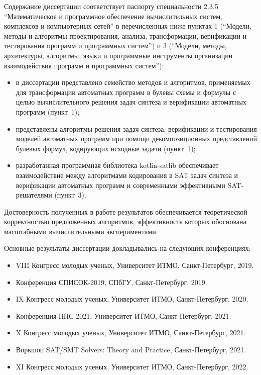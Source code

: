 \relevance
%
Содержание диссертации соответствует паспорту специальности 2.3.5 \enquote{Математическое и программное обеспечение вычислительных систем, комплексов и компьютерных сетей} в перечисленных ниже пунктах 1 (\enquote{Модели, методы и алгоритмы проектирования, анализа, трансформации, верификации и тестирования программ и программных систем}) и 3 (\enquote{Модели, методы, архитектуры, алгоритмы, языки и программные инструменты организации взаимодействия программ и программных систем}):
\begin{itemize}[beginpenalty=10000]
    \item в диссертации представлено семейство методов и алгоритмов, применяемых для трансформации автоматных программ в булевы схемы и формулы с целью вычислительного решения задач синтеза и верификации автоматных программ (пункт~1);
    \item представлены алгоритмы решения задач синтеза, верификации и тестирования моделей автоматных программ при помощи декомпозиционных представлений булевых формул, кодирующих исходные задачи (пункт~1);
    \item разработанная программная библиотека kotlin-satlib обеспечивает взаимодействие между алгоритмами кодирования в SAT задач синтеза и верификации автоматных программ и современными эффективными SAT-решателями (пункт~3).
\end{itemize}


{\reliability}
%
Достоверность полученных в работе результатов обеспечивается теоретической корректностью предложенных алгоритмов, эффективность которых обоснована масштабными вычислительными экспериментами.


\probation
%
Основные результаты диссертации докладывались на следующих конференциях:
\begin{itemize}[beginpenalty=10000]
    \item VIII Конгресс молодых ученых, Университет ИТМО, Санкт-Петербург, 2019.
    \item Конференция СПИСОК-2019, СПбГУ, Санкт-Петербург, 2019.
    \item IX Конгресс молодых ученых, Университет ИТМО, Санкт-Петербург, 2020.
    \item Конференция ППС 2021, Университет ИТМО, Санкт-Петербург, 2021.
    \item X Конгресс молодых ученых, Университет ИТМО, Санкт-Петербург, 2021.
    \item Воркшоп SAT/SMT Solvers: Theory and Practice, Санкт-Петербург, 2021.
    \item XI Конгресс молодых ученых, Университет ИТМО, Санкт-Петербург, 2022.
\end{itemize}

